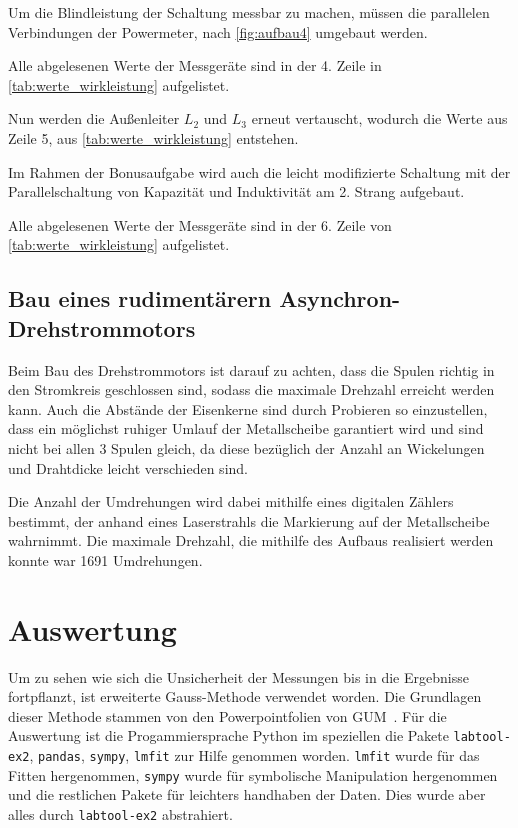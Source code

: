 \documentclass[12pt,english,ngerman]{scrartcl}
\begin{document}
Um die Blindleistung der Schaltung messbar zu machen, müssen die parallelen
Verbindungen der Powermeter, nach \autoref{fig:aufbau4} umgebaut werden.

Alle abgelesenen Werte der Messgeräte sind in der 4. Zeile in
\autoref{tab:werte_wirkleistung} aufgelistet.

Nun werden die Außenleiter $L_2$ und $L_3$ erneut vertauscht, wodurch die Werte
aus Zeile 5, aus \autoref{tab:werte_wirkleistung} entstehen.

Im Rahmen der Bonusaufgabe wird auch die leicht modifizierte Schaltung mit der
Parallelschaltung von Kapazität und Induktivität am 2. Strang aufgebaut.

Alle abgelesenen Werte der Messgeräte sind in der 6. Zeile von
\autoref{tab:werte_wirkleistung} aufgelistet.

\subsection{Bau eines rudimentärern Asynchron-Drehstrommotors}

Beim Bau des Drehstrommotors ist darauf zu achten, dass die Spulen richtig in
den Stromkreis geschlossen sind, sodass die maximale Drehzahl erreicht werden
kann. Auch die Abstände der Eisenkerne sind durch Probieren so einzustellen,
dass ein möglichst ruhiger Umlauf der Metallscheibe garantiert wird und sind
nicht bei allen 3 Spulen gleich, da diese bezüglich der Anzahl an Wickelungen
und Drahtdicke leicht verschieden sind.

Die Anzahl der Umdrehungen wird dabei mithilfe eines digitalen Zählers
bestimmt, der anhand eines Laserstrahls die Markierung auf der Metallscheibe
wahrnimmt. Die maximale Drehzahl, die mithilfe des Aufbaus realisiert werden
konnte war 1691 Umdrehungen.


\section{Auswertung}\label{sec:auswertung}

Um zu sehen wie sich die Unsicherheit der Messungen bis in die Ergebnisse
fortpflanzt, ist erweiterte Gauss-Methode verwendet worden. Die Grundlagen
dieser Methode stammen von den Powerpointfolien von
GUM~\cite{wolfgang_kessel_isobipm-gum_2004}. Für die Auswertung ist die
Progammiersprache Python im speziellen die Pakete \verb#labtool-ex2#,
\verb#pandas#, \verb#sympy#, \verb#lmfit# zur Hilfe genommen worden.
\verb#lmfit# wurde für das Fitten hergenommen, \verb#sympy# wurde für
symbolische Manipulation hergenommen und die restlichen Pakete für leichters
handhaben der Daten. Dies wurde aber alles durch \verb#labtool-ex2#
abstrahiert.
\end{document}
